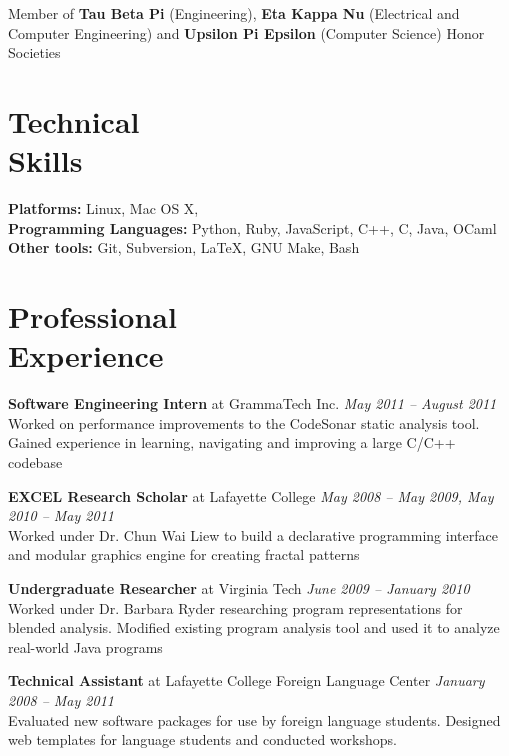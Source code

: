 \documentclass[margin,line]{resume}
\begin{document}
\begin{resume}
    Member of {\bf Tau Beta Pi} (Engineering), {\bf Eta Kappa Nu} (Electrical
    and Computer Engineering) and {\bf Upsilon Pi Epsilon} (Computer Science)
    Honor Societies

    \section{Technical\\ Skills}

    {\bf Platforms:} Linux, Mac OS X,\\
    {\bf Programming Languages:} Python, Ruby, JavaScript, C++, C, Java, OCaml\\
    {\bf Other tools:} Git, Subversion, \LaTeX, GNU Make, Bash

    \section{Professional\\Experience}

    {\bf Software Engineering Intern} at GrammaTech Inc. \hfill
    {\it May 2011 -- August 2011} \\
    Worked on performance improvements to the CodeSonar static analysis tool.
    Gained experience in learning, navigating and improving a large C/C++
    codebase

    {\bf EXCEL Research Scholar} at Lafayette College \hfill
    {\it May 2008 -- May 2009, May 2010 -- May 2011}\\
    Worked under Dr. Chun Wai Liew to build a declarative programming interface
    and modular graphics engine for creating fractal patterns

    {\bf Undergraduate Researcher} at Virginia Tech \hfill
    {\it June 2009 -- January 2010}\\
    Worked under Dr. Barbara Ryder researching program representations for
    blended analysis. Modified existing program analysis tool and used it to
    analyze real-world Java programs

    {\bf Technical Assistant} at Lafayette College Foreign Language Center
    \hfill
    {\it January 2008 -- May 2011}\\
    Evaluated new software packages for use by foreign language students.
    Designed web templates for language students and conducted workshops.


\end{resume}
\end{document}
